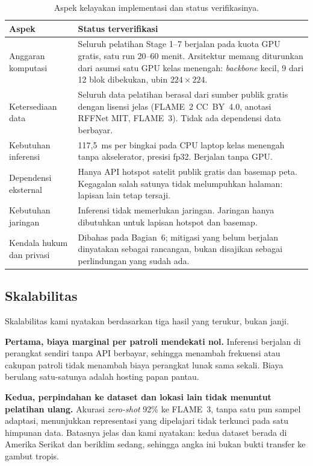 \begin{table}[!htbp]
\centering
\small
\begin{tabular}{p{3.0cm}p{8.8cm}}
\hline
\textbf{Aspek} & \textbf{Status terverifikasi} \\
\hline
Anggaran komputasi &
Seluruh pelatihan Stage 1--7 berjalan pada kuota GPU gratis, satu run 20--60
menit. Arsitektur memang diturunkan dari asumsi satu GPU kelas menengah:
\emph{backbone} kecil, 9 dari 12 blok dibekukan, ubin $224 \times 224$. \\
Ketersediaan data &
Seluruh data pelatihan berasal dari sumber publik gratis dengan lisensi jelas
(FLAME~2 CC~BY~4.0, anotasi RFFNet MIT, FLAME~3). Tidak ada dependensi data
berbayar. \\
Kebutuhan inferensi &
117,5~ms per bingkai pada CPU laptop kelas menengah tanpa akselerator, presisi
fp32. Berjalan tanpa GPU. \\
Dependensi eksternal &
Hanya API hotspot satelit publik gratis dan basemap peta. Kegagalan salah
satunya tidak melumpuhkan halaman: lapisan lain tetap tersaji. \\
Kebutuhan jaringan &
Inferensi tidak memerlukan jaringan. Jaringan hanya dibutuhkan untuk lapisan
hotspot dan basemap. \\
Kendala hukum dan privasi &
Dibahas pada Bagian~6; mitigasi yang belum berjalan dinyatakan sebagai
rancangan, bukan disajikan sebagai perlindungan yang sudah ada. \\
\hline
\end{tabular}
\caption{Aspek kelayakan implementasi dan status verifikasinya.}
\end{table}

\subsection*{Skalabilitas}

Skalabilitas kami nyatakan berdasarkan tiga hasil yang terukur, bukan janji.

\textbf{Pertama, biaya marginal per patroli mendekati nol.} Inferensi berjalan
di perangkat sendiri tanpa API berbayar, sehingga menambah frekuensi atau
cakupan patroli tidak menambah biaya perangkat lunak sama sekali. Biaya
berulang satu-satunya adalah hosting papan pantau.

\textbf{Kedua, perpindahan ke dataset dan lokasi lain tidak menuntut pelatihan
ulang.} Akurasi \emph{zero-shot} 92\% ke FLAME~3, tanpa satu pun sampel
adaptasi, menunjukkan representasi yang dipelajari tidak terkunci pada satu
himpunan data. Batasnya jelas dan kami nyatakan: kedua dataset berada di
Amerika Serikat dan beriklim sedang, sehingga angka ini bukan bukti transfer ke
gambut tropis.

